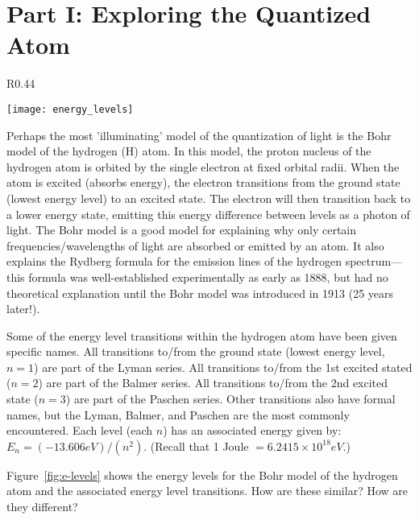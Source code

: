 \section*{Part I: Exploring the Quantized Atom}
%
\begin{wrapfigure}{R}{0.44\textwidth}
  \vspace{-15pt}  
  \begin{center}
    \texttt{[image: energy\_levels]}
  \end{center}
  \vspace{-20pt}
  \caption{Energy level transitions for the Bohr Model of the hydrogen atom.}
  \label{fig:e-levels}
  \vspace{-10pt}
\end{wrapfigure}
%
Perhaps the most 'illuminating' model of the quantization of light is the Bohr model of the hydrogen (H) atom. 
In this model, the proton nucleus of the hydrogen atom is orbited by the single electron at fixed orbital radii. 
When the atom is excited (absorbs energy), the electron transitions from the ground state (lowest energy level) to an excited state. 
The electron will then transition back to a lower energy state, emitting this energy difference between levels as a photon of light. 
The Bohr model is a good model for explaining why only certain frequencies/wavelengths of light are absorbed or emitted by an atom. 
It also explains the Rydberg formula for the emission lines of the hydrogen spectrum—this formula was well-established experimentally as early as 1888, but had no theoretical explanation until the Bohr model was introduced in 1913 (25 years later!). 
\par 
Some of the energy level transitions within the hydrogen atom have been given specific names. 
All transitions to/from the ground state (lowest energy level, $n = 1$) are part of the Lyman series. 
All transitions to/from the 1st excited stated ($n = 2$) are part of the Balmer series. 
All transitions to/from the 2nd excited state ($n = 3$) are part of the Paschen series. 
Other transitions also have formal names, but the Lyman, Balmer, and Paschen are the most commonly encountered. 
Each level (each $n$) has an associated energy given by: $E_{n}=(-13.606 eV)/(n^{2})$. 
(Recall that 1 Joule $= 6.2415 \times 10^{18} eV$.) 
\par 
Figure~\ref{fig:e-levels} shows the energy levels for the Bohr model of the hydrogen atom and the associated energy level transitions. 
How are these similar? 
How are they different? 

